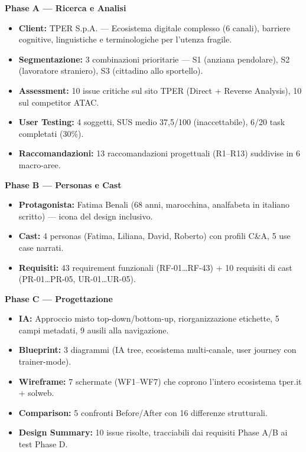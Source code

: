 ﻿\documentclass[11pt,a4paper]{article}
\begin{document}
\vspace{0.4cm}

\begin{tcolorbox}[sectionbox]
\small

\noindent\textbf{Phase A --- Ricerca e Analisi}
\begin{itemize}[leftmargin=*]
  \item \textbf{Client:} TPER S.p.A. --- Ecosistema digitale complesso (6 canali), barriere cognitive, linguistiche e terminologiche per l'utenza fragile.
  \item \textbf{Segmentazione:} 3 combinazioni prioritarie --- S1 (anziana pendolare), S2 (lavoratore straniero), S3 (cittadino allo sportello).
  \item \textbf{Assessment:} 10 issue critiche sul sito TPER (Direct + Reverse Analysis), 10 sul competitor ATAC.
  \item \textbf{User Testing:}   4 soggetti, SUS medio 37,5/100 (inaccettabile), 6/20 task completati (30\%).
  \item \textbf{Raccomandazioni:} 13 raccomandazioni progettuali (R1--R13) suddivise in 6 macro-aree.
\end{itemize}

\vspace{0.2cm}

\noindent\textbf{Phase B --- Personas e Cast}
\begin{itemize}[leftmargin=*]
  \item \textbf{Protagonista:} Fatima Benali (68 anni, marocchina, analfabeta in italiano scritto) --- icona del design inclusivo.
  \item \textbf{Cast:} 4 personas (Fatima, Liliana, David, Roberto) con profili C\&A, 5 use case narrati.
  \item \textbf{Requisiti:} 43 requirement funzionali (RF-01\ldots{}RF-43) + 10 requisiti di cast (PR-01\ldots{}PR-05, UR-01\ldots{}UR-05).
\end{itemize}

\vspace{0.2cm}

\noindent\textbf{Phase C --- Progettazione}
\begin{itemize}[leftmargin=*]
  \item \textbf{IA:} Approccio misto top-down/bottom-up, riorganizzazione etichette, 5 campi metadati, 9 ausili alla navigazione.
  \item \textbf{Blueprint:} 3 diagrammi (IA tree, ecosistema multi-canale, user journey con trainer-mode).
  \item \textbf{Wireframe:} 7 schermate (WF1--WF7) che coprono l'intero ecosistema tper.it + solweb.
  \item \textbf{Comparison:} 5 confronti Before/After con 16 differenze strutturali.
  \item \textbf{Design Summary:} 10 issue risolte, tracciabili dai requisiti Phase A/B ai test Phase D.
\end{itemize}


\end{tcolorbox}
\end{document}
